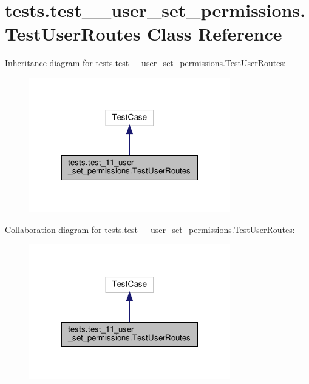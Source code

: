 \hypertarget{classtests_1_1test__11__user__set__permissions_1_1_test_user_routes}{}\section{tests.\+test\+\_\+\_\+user\+\_\+set\+\_\+permissions.\+Test\+User\+Routes Class Reference}
\label{classtests_1_1test__11__user__set__permissions_1_1_test_user_routes}


Inheritance diagram for tests.\+test\+\_\+\_\+user\+\_\+set\+\_\+permissions.\+Test\+User\+Routes\+:\nopagebreak
\begin{figure}[H]
\begin{center}
\leavevmode
\includegraphics[width=248pt]{classtests_1_1test__11__user__set__permissions_1_1_test_user_routes__inherit__graph}
\end{center}
\end{figure}


Collaboration diagram for tests.\+test\+\_\+\_\+user\+\_\+set\+\_\+permissions.\+Test\+User\+Routes\+:\nopagebreak
\begin{figure}[H]
\begin{center}
\leavevmode
\includegraphics[width=248pt]{classtests_1_1test__11__user__set__permissions_1_1_test_user_routes__coll__graph}
\end{center}
\end{figure}
